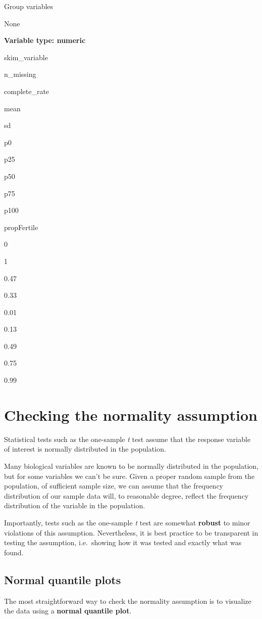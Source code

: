 \documentclass[
]{book}
\begin{document}
Group variables

None

\textbf{Variable type: numeric}

skim\_variable

n\_missing

complete\_rate

mean

sd

p0

p25

p50

p75

p100

propFertile

0

1

0.47

0.33

0.01

0.13

0.49

0.75

0.99

\section{Checking the normality assumption}\label{checknorm_assum}

Statistical tests such as the one-sample \emph{t} test assume that the response variable of interest is normally distributed in the population.

Many biological variables are known to be normally distributed in the population, but for some variables we can't be sure. Given a proper random sample from the population, of sufficient sample size, we can assume that the frequency distribution of our sample data will, to reasonable degree, reflect the frequency distribution of the variable in the population.

Importantly, tests such as the one-sample \emph{t} test are somewhat \textbf{robust} to minor violations of this assumption. Nevertheless, it is best practice to be transparent in testing the assumption, i.e.~showing how it was tested and exactly what was found.

\subsection{Normal quantile plots}\label{quantile_plots}

The most straightforward way to check the normality assumption is to visualize the data using a \textbf{normal quantile plot}.
\end{document}
